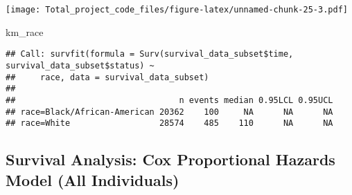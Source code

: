 \documentclass[]{article}
\newenvironment{Shaded}{\begin{snugshade}}{\end{snugshade}}
\newcommand{\KeywordTok}[1]{\textcolor[rgb]{0.13,0.29,0.53}{\textbf{#1}}}
\newcommand{\DataTypeTok}[1]{\textcolor[rgb]{0.13,0.29,0.53}{#1}}
\newcommand{\DecValTok}[1]{\textcolor[rgb]{0.00,0.00,0.81}{#1}}
\newcommand{\StringTok}[1]{\textcolor[rgb]{0.31,0.60,0.02}{#1}}
\newcommand{\CommentTok}[1]{\textcolor[rgb]{0.56,0.35,0.01}{\textit{#1}}}
\newcommand{\OperatorTok}[1]{\textcolor[rgb]{0.81,0.36,0.00}{\textbf{#1}}}
\newcommand{\NormalTok}[1]{#1}
\begin{document}
\begin{Shaded}
\end{Shaded}

\texttt{[image: Total\_project\_code\_files/figure-latex/unnamed-chunk-25-3.pdf]}

\begin{Shaded}
\begin{Highlighting}[]
\NormalTok{km_race}
\end{Highlighting}
\end{Shaded}

\begin{verbatim}
## Call: survfit(formula = Surv(survival_data_subset$time, survival_data_subset$status) ~ 
##     race, data = survival_data_subset)
## 
##                                 n events median 0.95LCL 0.95UCL
## race=Black/African-American 20362    100     NA      NA      NA
## race=White                  28574    485    110      NA      NA
\end{verbatim}

\subsection{Survival Analysis: Cox Proportional Hazards Model (All
Individuals)}\label{survival-analysis-cox-proportional-hazards-model-all-individuals}
\end{document}
